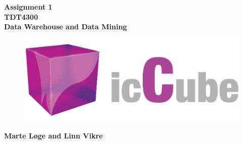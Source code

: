 \begin{titlepage}
\begin{center}

{\Huge \bf Assignment 1} \\[1.0cm]
{\Huge \bf TDT4300} \\[1.0cm]
{\Large \bf Data Warehouse and Data Mining}\\[4.0cm]

\begin{figure}[H]
	\includegraphics[width=\textwidth]{pics/iccube.png}
\end{figure}

\vspace{6cm}

{\Large \bf Marte Løge and Linn Vikre}


\end{center}
\end{titlepage}